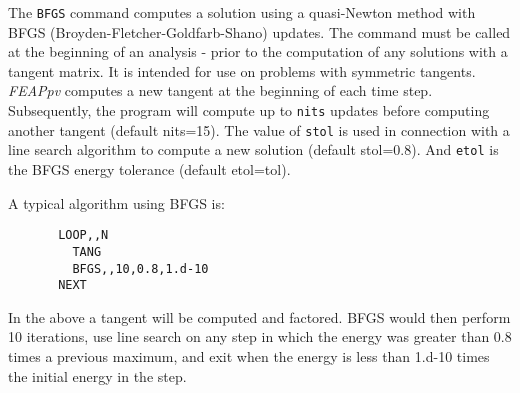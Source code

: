\headb

The {\tt BFGS} command computes a solution using a quasi-Newton
method with BFGS (Broyden-Fletcher-Goldfarb-Shano)
updates.  The command must be called at the beginning of an
analysis - prior to the computation of any solutions with a
tangent matrix.  It is intended for use on problems with
symmetric tangents.  \textsl{FEAPpv} computes a new tangent at the
beginning of each time step.  Subsequently, the program will
compute up to {\tt nits} updates before computing another
tangent (default nits=15). The value of {\tt stol} is used in
connection with a line search algorithm to compute a new
solution (default stol=0.8). And {\tt etol} is the BFGS energy
tolerance (default etol=tol).

A typical algorithm using BFGS is:

\begin{verbatim}
       LOOP,,N
         TANG
         BFGS,,10,0.8,1.d-10
       NEXT
\end{verbatim}

In the above a tangent will be computed and factored.  BFGS
would then perform 10 iterations, use line search on any
step in which the energy was greater than 0.8 times a previous
maximum, and exit when the energy is less than 1.d-10
times the initial energy in the step.
\vfill\eject
